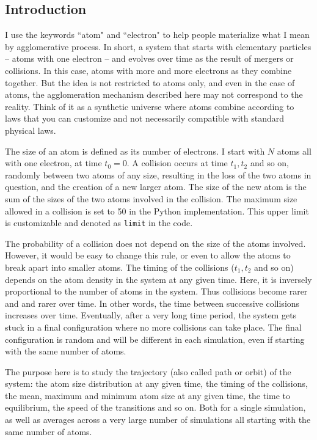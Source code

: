 \documentclass[oneside,10pt]{book}
\begin{document}
\subsection{Introduction}\label{dk6fb}\label{twql98}

I use the keywords ``atom" and ``electron" to help people materialize what I mean by agglomerative process. In short, a system
 that starts with elementary particles -- atoms with one electron -- and evolves over time as the result of mergers or
 collisions. In this case, atoms with more and more electrons as they combine together.  But the idea is not restricted to atoms only, and even in the case of atoms, the agglomeration mechanism described here may not correspond to the reality. Think of it as a synthetic universe where atoms combine according to laws that you can customize and not necessarily compatible
 with standard physical laws.

The size of an atom is defined as its number of electrons. I start with $N$ atoms all with one electron, at time $t_0=0$. A collision occurs at time $t_1,t_2$ and so on, randomly between two atoms of any size, resulting in the loss of the two atoms in question, and the creation of a new larger atom.
 The size of the new atom is the sum of the sizes of the two atoms involved in the collision. The maximum size allowed in a collision is set to 50 in the Python implementation. This upper limit is customizable and denoted as \texttt{limit} in the code. 

The probability of a collision does not depend on the size of the atoms involved. However, it would be easy to change this rule, or even to allow the atoms to break apart into smaller atoms. The timing of the collisions ($t_1,t_2$ and so on) depends on the atom density in the system at any given time. Here, it is inversely proportional to the number of atoms 
 in the system. Thus collisions become rarer and and rarer over time. In other words, the time between successive collisions increases over time.  Eventually, after a very long time period, the system gets stuck in a final configuration where no more collisions can take place. The final configuration is random and will be different in each simulation, even if starting with the same number of atoms. 

The purpose here is to study the trajectory (also called path or orbit) of the system: the atom size distribution at any given time, the timing of the collisions, the mean, maximum and minimum atom size at any given time, the time to equilibrium, the speed of the transitions and so on. Both for a single simulation, as well as averages across a very large number of simulations  all starting with the same number of atoms.
\end{document}
